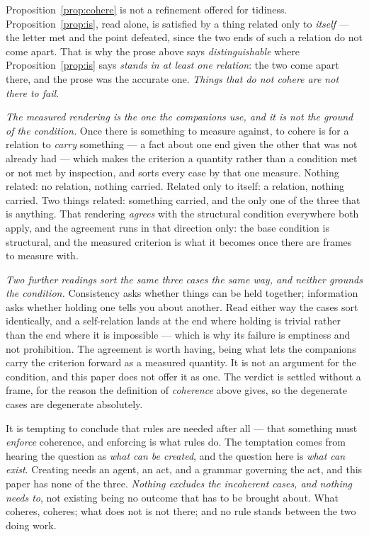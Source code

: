 \documentclass[11pt,a4paper]{article}
\begin{document}
Proposition~\ref{prop:cohere} is not a refinement offered for tidiness.
Proposition~\ref{prop:is}, read alone, is satisfied by a thing related only to \emph{itself} --- the
letter met and the point defeated, since the two ends of such a relation do not come apart. That is why
the prose above says \emph{distinguishable} where Proposition~\ref{prop:is} says \emph{stands in at
least one relation}: the two come apart there, and the prose was the accurate one. \emph{Things that do
not cohere are not there to fail.}

\emph{The measured rendering is the one the companions use, and it is not the ground of the condition.}
Once there is something to measure against, to cohere is for a relation to \emph{carry} something --- a
fact about one end given the other that was not already had --- which makes the criterion a quantity
rather than a condition met or not met by inspection, and sorts every case by that one measure. Nothing
related: no relation, nothing carried. Related only to itself: a relation, nothing carried. Two things
related: something carried, and the only one of the three that is anything. That rendering
\emph{agrees} with the structural condition everywhere both apply, and the agreement runs in that
direction only: the base condition is structural, and the measured criterion is what it becomes once
there are frames to measure with.

\emph{Two further readings sort the same three cases the same way, and neither grounds the
condition.} Consistency asks whether things can be held together; information asks whether holding one
tells you about another. Read either way the cases sort identically, and a self-relation lands at the
end where holding is trivial rather than the end where it is impossible --- which is why its failure is
emptiness and not prohibition. The agreement is worth having, being what lets the companions carry the
criterion forward as a measured quantity. It is not an argument for the condition, and this paper does
not offer it as one. The verdict is settled without a frame, for the reason the definition of
\emph{coherence} above gives, so the degenerate cases are degenerate absolutely.

It is tempting to conclude that rules are needed after all --- that something must \emph{enforce}
coherence, and enforcing is what rules do. The temptation comes from hearing the question as \emph{what
can be created}, and the question here is \emph{what can exist}. Creating needs an agent, an act, and a
grammar governing the act, and this paper has none of the three. \emph{Nothing excludes the incoherent
cases, and nothing needs to}, not existing being no outcome that has to be brought about. What coheres,
coheres; what does not is not there; and no rule stands between the two doing work.
\end{document}
